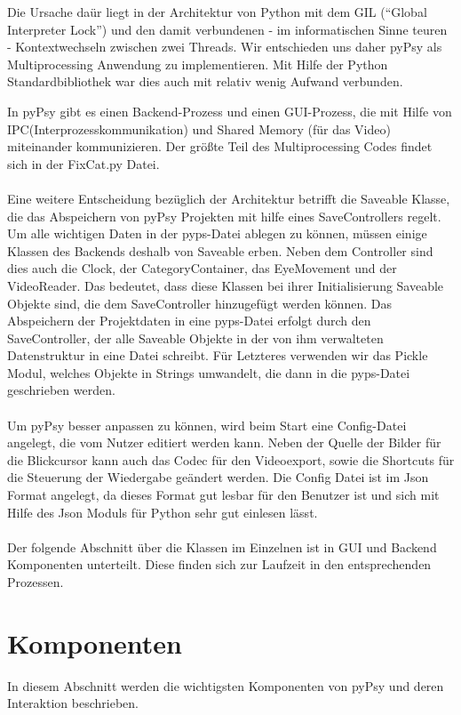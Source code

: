 \documentclass[a4paper,draft]{scrartcl}
\begin{document}
Die Ursache da\"ur liegt in der Architektur von Python mit dem GIL ("`Global Interpreter Lock"') und den damit verbundenen - im informatischen Sinne teuren - Kontextwechseln zwischen zwei Threads.
Wir entschieden uns daher pyPsy als Multiprocessing Anwendung zu implementieren.
Mit Hilfe der Python Standardbibliothek war dies auch mit relativ wenig Aufwand verbunden.

In pyPsy gibt es einen Backend-Prozess und einen GUI-Prozess, die mit Hilfe von IPC(Interprozesskommunikation) und Shared Memory (für das Video) miteinander kommunizieren.
Der gr\"o\ss te Teil des Multiprocessing Codes findet sich in der FixCat.py Datei.
\\ \\
Eine weitere Entscheidung bezüglich der Architektur betrifft die Saveable Klasse, die das Abspeichern von pyPsy Projekten mit hilfe eines SaveControllers regelt. Um alle wichtigen Daten in der pyps-Datei ablegen zu können, müssen einige Klassen des Backends deshalb von Saveable erben. Neben dem Controller sind dies auch die Clock, der CategoryContainer, das EyeMovement und der VideoReader. Das bedeutet, dass diese Klassen bei ihrer Initialisierung Saveable Objekte sind, die dem SaveController hinzugefügt werden können. Das Abspeichern der Projektdaten in eine pyps-Datei erfolgt durch den SaveController, der alle Saveable Objekte in der von ihm verwalteten Datenstruktur in eine Datei schreibt. Für Letzteres verwenden wir das Pickle Modul, welches Objekte in Strings umwandelt, die dann in die pyps-Datei geschrieben werden. 
\\ \\
Um pyPsy besser anpassen zu können, wird beim Start eine Config-Datei angelegt, die vom Nutzer editiert werden kann. Neben der Quelle der Bilder für die Blickcursor kann auch das Codec für den Videoexport, sowie die Shortcuts für die Steuerung der Wiedergabe geändert werden. Die Config Datei ist im Json Format angelegt, da dieses Format gut lesbar für den Benutzer ist und sich mit Hilfe des Json Moduls für Python sehr gut einlesen lässt. 
\\ \\
Der folgende Abschnitt über die Klassen im Einzelnen ist in GUI und Backend Komponenten unterteilt.
Diese finden sich zur Laufzeit in den entsprechenden Prozessen.

\section{Komponenten}
In diesem Abschnitt werden die wichtigsten Komponenten von pyPsy und deren Interaktion beschrieben.
\end{document}
